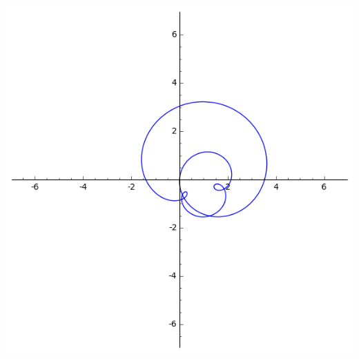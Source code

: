 \documentclass[class=report,crop=false]{standalone}
\begin{document}
\begin{center}
\includegraphics[scale=0.3]{figures/polynome3}
\end{center}
\end{document}
